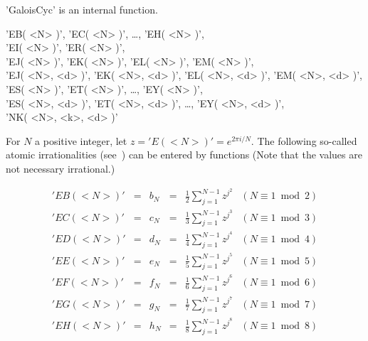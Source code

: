 'GaloisCyc' is an internal function.


'EB( <N> )', 'EC( <N> )', \ldots, 'EH( <N> )',\\
'EI( <N> )', 'ER( <N> )',\\
'EJ( <N> )', 'EK( <N> )', 'EL( <N> )', 'EM( <N> )',\\
'EJ( <N>, <d> )', 'EK( <N>, <d> )', 'EL( <N>, <d> )', 'EM( <N>, <d> )',\\
'ES( <N> )', 'ET( <N> )', \ldots, 'EY( <N> )',\\
'ES( <N>, <d> )', 'ET( <N>, <d> )', \ldots, 'EY( <N>, <d> )',\\
'NK( <N>, <k>, <d> )'

For $N$ a positive integer, let $z = 'E(<N>)' = e^{2 \pi i / N}$.  The
following   so-called  atomic  irrationalities  (see~\cite[Chapter  7,
Section 10]{CCN85}) can be entered by functions (Note that the  values
are not necessary irrational.)\:

\[\begin{array}{llllll}
'EB(<N>)' & = & b_N & = & \frac{1}{2}\sum_{j=1}^{N-1}z^{j^{2}} &
 (N\equiv 1\bmod 2)\\

'EC(<N>)' & = & c_N & = & \frac{1}{3}\sum_{j=1}^{N-1}z^{j^{3}} &
 (N\equiv 1\bmod 3)\\

'ED(<N>)' & = & d_N & = & \frac{1}{4}\sum_{j=1}^{N-1}z^{j^{4}} &
 (N\equiv 1\bmod 4)\\

'EE(<N>)' & = & e_N & = & \frac{1}{5}\sum_{j=1}^{N-1}z^{j^{5}} &
 (N\equiv 1\bmod 5)\\

'EF(<N>)' & = & f_N & = & \frac{1}{6}\sum_{j=1}^{N-1}z^{j^{6}} &
 (N\equiv 1\bmod 6)\\

'EG(<N>)' & = & g_N & = & \frac{1}{7}\sum_{j=1}^{N-1}z^{j^{7}} &
 (N\equiv 1\bmod 7)\\

'EH(<N>)' & = & h_N & = & \frac{1}{8}\sum_{j=1}^{N-1}z^{j^{8}} &
 (N\equiv 1\bmod 8)
\end{array}\]

